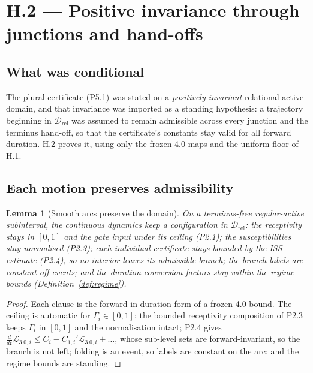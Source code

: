 \documentclass[11pt,a4paper]{article}
\theoremstyle{definition}
\theoremstyle{plain}
\newtheorem{lemma}[definition]{Lemma}
\theoremstyle{remark}
\begin{document}
\section{H.2 --- Positive invariance through junctions and hand-offs}

\subsection{What was conditional}

The plural certificate (P5.1) was stated on a \emph{positively invariant} relational active
domain, and that invariance was imported as a standing hypothesis: a trajectory beginning in
\(\mathcal D_{\mathrm{rel}}\) was assumed to remain admissible across every junction and the
terminus hand-off, so that the certificate's constants stay valid for all forward duration.
H.2 proves it, using only the frozen 4.0 maps and the uniform floor of H.1.

\subsection{Each motion preserves admissibility}

\begin{lemma}[Smooth arcs preserve the domain]\label{lem:smooth}
On a terminus-free regular-active subinterval, the continuous dynamics keep a configuration
in \(\mathcal D_{\mathrm{rel}}\): the receptivity stays in \([0,1]\) and the gate input under
its ceiling (P2.1); the susceptibilities stay normalised (P2.3); each individual certificate
stays bounded by the ISS estimate (P2.4), so no interior leaves its admissible branch; the
branch labels are constant off events; and the duration-conversion factors stay within the
regime bounds (Definition~\ref{def:regime}).
\end{lemma}

\begin{proof}
Each clause is the forward-in-duration form of a frozen 4.0 bound. The ceiling is automatic
for \(\Gamma_i\in[0,1]\); the bounded receptivity composition of P2.3 keeps \(\Gamma_i\) in
\([0,1]\) and the normalisation intact; P2.4 gives
\(\tfrac{d}{d\mathfrak c}\mathcal L_{3.0,i}\le C_i-C_{1,i}'\mathcal L_{3.0,i}+\dots\), whose
sub-level sets are forward-invariant, so the branch is not left; folding is an event, so
labels are constant on the arc; and the regime bounds are standing. \qedhere
\end{proof}
\end{document}
